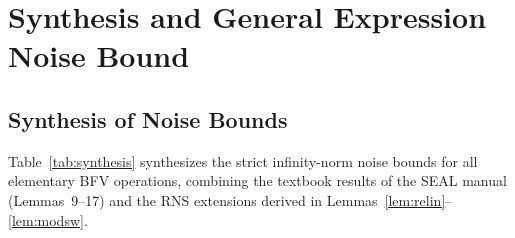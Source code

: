 \documentclass[11pt]{article}
\theoremstyle{definition}
\theoremstyle{remark}
\begin{document}
\section*{Synthesis and General Expression Noise Bound}

\subsection*{Synthesis of Noise Bounds}

Table~\ref{tab:synthesis} synthesizes the strict infinity-norm noise bounds for all elementary BFV operations, combining the textbook results of the SEAL manual (Lemmas~9--17) and the RNS extensions derived in Lemmas~\ref{lem:relin}--\ref{lem:modsw}.
\end{document}
